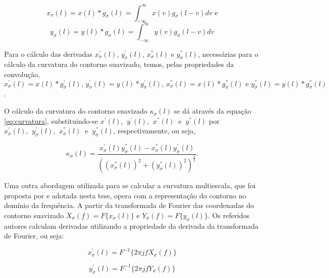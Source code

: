\begin{equation}
x_{\sigma}(l) = x(l) * g_{\sigma}(l) = \int^{\infty}_{-\infty}{x(v)g_{\sigma}(l-v)}dv \text{ e}
\end{equation}
\begin{equation}
y_{\sigma}(l) = y(l) * g_{\sigma}(l)=\int^{\infty}_{-\infty}{y(v)g_{\sigma}(l-v)}dv
\end{equation}

Para o cálculo das derivadas $x^{'}_{\sigma}(l)\text{, }y^{'}_{\sigma}(l)\text{, }x^{''}_{\sigma}(l) \text{ e }y^{''}_{\sigma}(l)$, necessárias para o cálculo da curvatura do contorno suavizado, temos, pelas propriedades da convolução, $x^{'}_{\sigma}(l) = x(l) * g^{'}_{\sigma}(l)\text{, }y^{'}_{\sigma}(l) = y(l) * g^{'}_{\sigma}(l)\text{, }x^{''}_{\sigma}(l) = x(l) * g^{''}_{\sigma}(l)\text{ e }
y^{''}_{\sigma}(l) = y(l) * g^{''}_{\sigma}(l)$.

O cálculo da curvatura do contorno suavizado $\kappa_{\sigma}(l)$ se dá através da equação \ref{eq:curvatura}, substituindo-se $x^{'}(l)\text{, }\:y^{'}(l)\text{, }\:x^{''}(l)\:\text{ e }\:y^{''}(l)$ por $x^{'}_{\sigma}(l)\text{, }\:y^{'}_{\sigma}(l)\text{, }\:x^{''}_{\sigma}(l)\:\text{ e }\:y^{''}_{\sigma}(l)$, respectivamente, ou seja,

\begin{equation} \label{eq:curvatura_ms}
\kappa_{\sigma}(l) = \frac{x_{\sigma}^{'}(l)y_{\sigma}^{''}(l)-x_{\sigma}^{''}(l)y_{\sigma}^{'}(l)}{((x_{\sigma}^{''}(l))^{2}+(y_{\sigma}^{''}(l))^{2})^{\frac{3}{2}}}\text{.}
\end{equation}

Uma outra abordagem utilizada para se calcular a curvatura multiescala, que foi proposta por  e adotada nesta tese, opera com a representação do contorno no domínio da frequência. A partir da transformada de Fourier das coordenadas do contorno suavizado $X_{\sigma}(f) = F\big\{x_{\sigma}(l)\big\}$ e $Y_{\sigma}(f) = F\big\{y_{\sigma}(l)\big\}$. Os referidos autores calculam derivadas utilizando a propriedade da derivada da transformada de Fourier, ou seja:

\begin{equation}
x_{\sigma}^{'}(l) = F^{-1}\big\{2 \pi j f  X_{\sigma}(f)\big\}
\end{equation}

\begin{equation}
y_{\sigma}^{'}(l) = F^{-1}\big\{2 \pi j f  Y_{\sigma}(f)\big\}
\end{equation}

